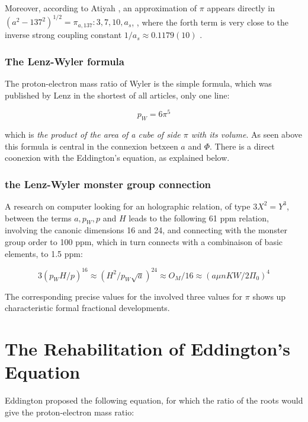 \documentclass[a4paper,9pt]{article}
\begin{document}
Moreover, according to Atiyah \cite{Atiyah1}, an approximation of $\pi$ appears directly in $(a^2-137^2)^{1/2} = \pi_{a,137} : 3, 7, 10, a_s$, , where the forth term is very close to the inverse strong coupling constant $1/a_s \approx 0.1179(10)$ \cite{Tanabashi}. 




\subsubsection {The Lenz-Wyler formula}

The proton-electron mass ratio of Wyler \cite{Wyler} is the simple formula, which was published by Lenz in the shortest of all articles, only one line: 

\begin{equation}
 p_W = 6\pi^5    
\end{equation}

which is \textit {the product of the area of a cube of side $\pi$ with its volume}. As seen above this formula is central in the connexion betxeen $a$ and $\Phi$. There is a direct coonexion with the Eddington's equation, as explained below. 




\subsubsection {the Lenz-Wyler monster group connection}

A research on computer looking for an holographic relation, of type $3X^2 = Y^3$, between the terms $a, p_W, p$ and $H$ leads to the following 61 ppm relation, involving the canonic dimensions 16 and 24, and connecting with the monster group order to 100 ppm, which in turn connects with a combinaison of basic elements, to 1.5 ppm:

\begin{equation}
3 (p_W H/p)^{16} \approx (H^2/p_W \sqrt a )^{24} \approx O_M / 16 \approx (a \mu n K W/2 \Pi_0)^4
\end{equation}

The corresponding precise values for the involved three values for $\pi$ shows up characteristic formal fractional developments. 





\section{The Rehabilitation of Eddington's Equation}
Eddington proposed the following equation, for which the ratio of the roots would give the proton-electron mass ratio:
\end{document}
